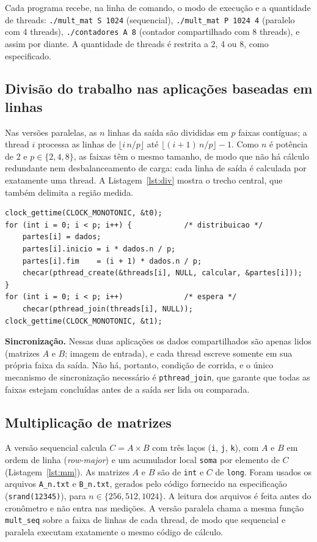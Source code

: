 \documentclass[12pt,a4paper]{article}
\begin{document}
Cada programa recebe, na linha de comando, o modo de execução e a quantidade de threads: \texttt{./mult\_mat S 1024} (sequencial), \texttt{./mult\_mat P 1024 4} (paralelo com 4 threads), \texttt{./contadores A 8} (contador compartilhado com 8 threads), e assim por diante. A quantidade de threads é restrita a 2, 4 ou 8, como especificado.

\subsection{Divisão do trabalho nas aplicações baseadas em linhas}

Nas versões paralelas, as $n$ linhas da saída são divididas em $p$ faixas contíguas; a thread $i$ processa as linhas de $\lfloor i\,n/p \rfloor$ até $\lfloor (i+1)\,n/p \rfloor - 1$. Como $n$ é potência de 2 e $p\in\{2,4,8\}$, as faixas têm o mesmo tamanho, de modo que não há cálculo redundante nem desbalanceamento de carga: cada linha de saída é calculada por exatamente uma thread. A Listagem~\ref{lst:div} mostra o trecho central, que também delimita a região medida.

\begin{lstlisting}[float=tp,caption={Criação, distribuição e junção das threads em \texttt{linhas.h}, com a região cronometrada.},label={lst:div}]
clock_gettime(CLOCK_MONOTONIC, &t0);
for (int i = 0; i < p; i++) {            /* distribuicao */
    partes[i] = dados;
    partes[i].inicio = i * dados.n / p;
    partes[i].fim    = (i + 1) * dados.n / p;
    checar(pthread_create(&threads[i], NULL, calcular, &partes[i]));
}
for (int i = 0; i < p; i++)              /* espera */
    checar(pthread_join(threads[i], NULL));
clock_gettime(CLOCK_MONOTONIC, &t1);
\end{lstlisting}

\textbf{Sincronização.} Nessas duas aplicações os dados compartilhados são apenas lidos (matrizes $A$ e $B$; imagem de entrada), e cada thread escreve somente em sua própria faixa da saída. Não há, portanto, condição de corrida, e o único mecanismo de sincronização necessário é \texttt{pthread\_join}, que garante que todas as faixas estejam concluídas antes de a saída ser lida ou comparada.

\subsection{Multiplicação de matrizes}

A versão sequencial calcula $C = A \times B$ com três laços (\texttt{i}, \texttt{j}, \texttt{k}), com $A$ e $B$ em ordem de linha (\emph{row-major}) e um acumulador local \texttt{soma} por elemento de $C$ (Listagem~\ref{lst:mm}). As matrizes $A$ e $B$ são de \texttt{int} e $C$ de \texttt{long}. Foram usados os arquivos \texttt{A\_n.txt} e \texttt{B\_n.txt}, gerados pelo código fornecido na especificação (\texttt{srand(12345)}), para $n \in \{256, 512, 1024\}$. A leitura dos arquivos é feita antes do cronômetro e não entra nas medições. A versão paralela chama a mesma função \texttt{mult\_seq} sobre a faixa de linhas de cada thread, de modo que sequencial e paralela executam exatamente o mesmo código de cálculo.
\end{document}
